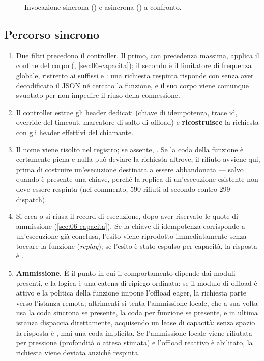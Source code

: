 \begin{figure}[htbp]
  \centering
  \resizebox{0.95\textwidth}{!}{}
  \caption{Invocazione sincrona () e asincrona ()
  a confronto.}
  \label{fig:flusso}
\end{figure}

\subsection{Percorso sincrono}

\begin{enumerate}[leftmargin=*]
  \item Due filtri precedono il controller. Il primo, con precedenza massima,
  applica il confine del corpo (, \cref{sec:06-capacita}); il
  secondo \`e il limitatore di frequenza globale, ristretto ai suffissi
   e : una richiesta respinta risponde  con
   senza aver decodificato il JSON n\'e cercato la funzione,
  e il suo corpo viene comunque svuotato per non impedire il riuso della
  connessione.

  \item Il controller estrae gli header dedicati (chiave di idempotenza, trace
  id, override del timeout, marcatore di salto di offload) e
  \textbf{ricostruisce} la richiesta con gli header effettivi del chiamante.

  \item Il nome viene risolto nel registro; se assente, . Se la coda
  della funzione \`e certamente piena e nulla pu\`o deviare la richiesta altrove, il
  rifiuto avviene qui, prima di costruire un'esecuzione destinata a essere
  abbandonata --- salvo quando \`e presente una chiave, perch\'e la replica di
  un'esecuzione esistente non deve essere respinta (nel commento, 590 rifiuti al
  secondo contro 299 dispatch).

  \item Si crea o si riusa il record di esecuzione, dopo aver riservato le
  quote di ammissione (\cref{sec:06-capacita}). Se la chiave di idempotenza
  corrisponde a un'esecuzione gi\`a conclusa, l'esito viene riprodotto
  immediatamente senza toccare la funzione (\emph{replay}); se l'esito \`e stato
  espulso per capacit\`a, la risposta \`e .

  \item \textbf{Ammissione.} \`E il punto in cui il comportamento dipende dai
  moduli presenti, e la logica \`e una catena di ripiego ordinata: se il modulo
  di offload \`e attivo e la politica della funzione impone l'offload eager, la
  richiesta parte verso l'istanza remota; altrimenti si tenta l'ammissione
  locale, che a sua volta usa la coda sincrona se presente, la coda per funzione se
  presente, e in ultima istanza dispaccia direttamente, acquisendo un lease di
  capacit\`a: senza spazio la risposta \`e , mai una coda implicita. Se l'ammissione locale
  viene rifiutata per pressione (profondit\`a o attesa stimata) e l'offload
  reattivo \`e abilitato, la richiesta viene deviata anzich\'e respinta.


\end{enumerate}
